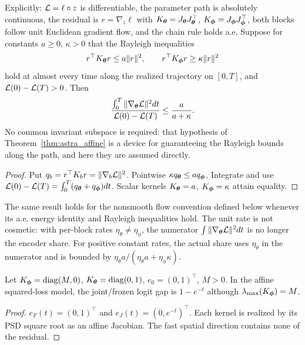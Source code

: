 \begin{corollary}
\label{cor:astra_attribution}
Explicitly: $\mathcal{L}=\ell\circ z$ is differentiable, the parameter path
is absolutely continuous, the residual is $r=\nabla_z\ell$ with
$K_{\boldsymbol{\theta}}=J_{\boldsymbol{\theta}} J_{\boldsymbol{\theta}}^\top$,
$K_{\boldsymbol{\phi}}=J_{\boldsymbol{\phi}} J_{\boldsymbol{\phi}}^\top$, both blocks follow unit Euclidean
gradient flow, and the chain rule holds a.e. Suppose for constants
$a\ge0$, $\kappa>0$ that the Rayleigh inequalities
\[
 r^\top K_{\boldsymbol{\theta}} r\le a\|r\|^2,\qquad
 r^\top K_{\boldsymbol{\phi}} r\ge\kappa\|r\|^2
\]
hold at almost every time along the realized trajectory on $[0,T]$,
and $\mathcal{L}(0)-\mathcal{L}(T)>0$. Then
\begin{equation}\label{eq:astra_attribution}
 \frac{\int_0^T\|\nabla_{\boldsymbol{\theta}}\mathcal{L}\|^2dt}{\mathcal{L}(0)-\mathcal{L}(T)}
 \le\frac{a}{a+\kappa}.
\end{equation}
No common invariant subspace is required: that hypothesis of
Theorem~\ref{thm:astra_affine} is a device for guaranteeing the
Rayleigh bounds along the path, and here they are assumed directly.
\end{corollary}
\begin{proof}
Put $q_b=r^\top K_b r=\|\nabla_b\mathcal{L}\|^2$.
Pointwise $\kappa q_{\boldsymbol{\theta}}\le a q_{\boldsymbol{\phi}}$. Integrate and use
$\mathcal{L}(0)-\mathcal{L}(T)=\int_0^T(q_{\boldsymbol{\theta}}+q_{\boldsymbol{\phi}})dt$.
Scalar kernels $K_{\boldsymbol{\theta}}=a$, $K_{\boldsymbol{\phi}}=\kappa$ attain equality.
\end{proof}
\begin{remark}
The same result holds for the nonsmooth flow convention defined below
whenever its a.e. energy identity and Rayleigh inequalities hold.
The unit rate is not cosmetic: with per-block rates $\eta_\theta\ne
\eta_\phi$, the numerator $\int\|\nabla_{\boldsymbol{\theta}}\mathcal{L}\|^2dt$ is no
longer the encoder share. For positive constant rates, the actual share
uses $\eta_\theta$ in the numerator and is bounded by
$\eta_\theta a/(\eta_\theta a+\eta_\phi\kappa)$.
\end{remark}

\begin{proposition}
\label{prop:astra_top_counter}
Let $K_{\boldsymbol{\phi}}=\operatorname{diag}(M,0)$,
$K_{\boldsymbol{\theta}}=\operatorname{diag}(0,1)$, $e_0=(0,1)^\top$, $M>0$.
In the affine squared-loss model, the joint/frozen logit gap is
$1-e^{-t}$ although $\lambda_{\max}(K_{\boldsymbol{\phi}})=M$.
\end{proposition}
\begin{proof}
$e_F(t)=(0,1)^\top$ and $e_J(t)=(0,e^{-t})^\top$. Each kernel is
realized by its PSD square root as an affine Jacobian. The fast spatial
direction contains none of the residual.
\end{proof}

